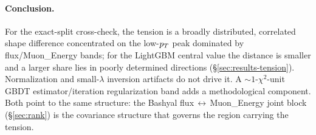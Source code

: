 \paragraph{Conclusion.} For the exact-split cross-check, the tension is a broadly distributed, correlated shape difference concentrated on the low-$p_{T}$ peak dominated by flux/Muon\_Energy bands; for the LightGBM central value the distance is smaller and a larger share lies in poorly determined directions (\S\ref{sec:results-tension}). Normalization and small-$\lambda$ inversion artifacts do not drive it. A $\sim1$-$\chi^{2}$-unit GBDT estimator/iteration regularization band adds a methodological component. Both point to the same structure: the Bashyal flux\,$\leftrightarrow$\,Muon\_Energy joint block (\S\ref{sec:rank}) is the covariance structure that governs the region carrying the tension.

